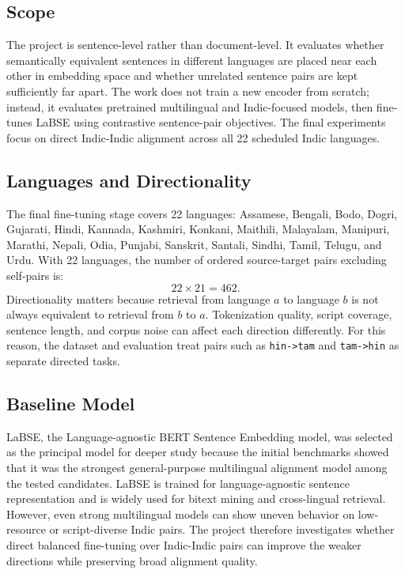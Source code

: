 \documentclass[12pt, a4paper]{article}
\begin{document}
\subsection{Scope}

The project is sentence-level rather than document-level. It evaluates whether semantically equivalent sentences in different languages are placed near each other in embedding space and whether unrelated sentence pairs are kept sufficiently far apart. The work does not train a new encoder from scratch; instead, it evaluates pretrained multilingual and Indic-focused models, then fine-tunes LaBSE using contrastive sentence-pair objectives. The final experiments focus on direct Indic-Indic alignment across all 22 scheduled Indic languages.

\subsection{Languages and Directionality}

The final fine-tuning stage covers 22 languages: Assamese, Bengali, Bodo, Dogri, Gujarati, Hindi, Kannada, Kashmiri, Konkani, Maithili, Malayalam, Manipuri, Marathi, Nepali, Odia, Punjabi, Sanskrit, Santali, Sindhi, Tamil, Telugu, and Urdu. With 22 languages, the number of ordered source-target pairs excluding self-pairs is:
\[
  22 \times 21 = 462.
\]
Directionality matters because retrieval from language $a$ to language $b$ is not always equivalent to retrieval from $b$ to $a$. Tokenization quality, script coverage, sentence length, and corpus noise can affect each direction differently. For this reason, the dataset and evaluation treat pairs such as \texttt{hin->tam} and \texttt{tam->hin} as separate directed tasks.

\subsection{Baseline Model}

LaBSE, the Language-agnostic BERT Sentence Embedding model, was selected as the principal model for deeper study because the initial benchmarks showed that it was the strongest general-purpose multilingual alignment model among the tested candidates. LaBSE is trained for language-agnostic sentence representation and is widely used for bitext mining and cross-lingual retrieval. However, even strong multilingual models can show uneven behavior on low-resource or script-diverse Indic pairs. The project therefore investigates whether direct balanced fine-tuning over Indic-Indic pairs can improve the weaker directions while preserving broad alignment quality.
\end{document}

